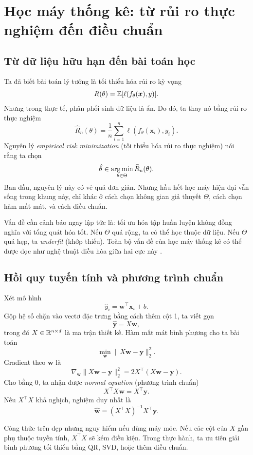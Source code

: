 \chapter{Học máy thống kê: từ rủi ro thực nghiệm đến điều chuẩn}

\section{Từ dữ liệu hữu hạn đến bài toán học}

Ta đã biết bài toán lý tưởng là tối thiểu hóa rủi ro kỳ vọng
\[
R(\theta)=\mathbb{E}[\ell(f_\theta(\bm{x}),y)].
\]
Nhưng trong thực tế, phân phối sinh dữ liệu là ẩn. Do đó, ta thay nó bằng rủi ro thực nghiệm
\[
\widehat{R}_n(\theta)=\frac{1}{n}\sum_{i=1}^n \ell(f_\theta(\bm{x}_i),y_i).
\]
Nguyên lý \emph{empirical risk minimization} (tối thiểu hóa rủi ro thực nghiệm) nói rằng ta chọn
\[
\hat{\theta}\in\mathop{\mathrm{arg\,min}}_{\theta\in\Theta}\widehat{R}_n(\theta).
\]
Ban đầu, nguyên lý này có vẻ quá đơn giản. Nhưng hầu hết học máy hiện đại vẫn sống trong khung này, chỉ khác ở cách chọn không gian giả thuyết \(\Theta\), cách chọn hàm mất mát, và cách điều chuẩn.

Vấn đề cần cảnh báo ngay lập tức là: tối ưu hóa tập huấn luyện không đồng nghĩa với tổng quát hóa tốt. Nếu \(\Theta\) quá rộng, ta có thể học thuộc dữ liệu. Nếu \(\Theta\) quá hẹp, ta \emph{underfit} (khớp thiếu). Toàn bộ vấn đề của học máy thống kê có thể được đọc như nghệ thuật điều hòa giữa hai cực này \citep{bishop2006prml,hastie2009esl}.

\section{Hồi quy tuyến tính và phương trình chuẩn}

Xét mô hình
\[
\hat{y}_i = \bm{w}^\top \bm{x}_i + b.
\]
Gộp hệ số chặn vào vectơ đặc trưng bằng cách thêm cột 1, ta viết gọn
\[
\hat{\bm{y}} = X\bm{w},
\]
trong đó $X\in\mathbb{R}^{n\times d}$ là ma trận thiết kế. Hàm mất mát bình phương cho ta bài toán
\[
\min_{\bm{w}} \|X\bm{w}-\bm{y}\|_2^2.
\]
Gradient theo \(\bm{w}\) là
\[
\nabla_{\bm{w}}\|X\bm{w}-\bm{y}\|_2^2 = 2X^\top(X\bm{w}-\bm{y}).
\]
Cho bằng 0, ta nhận được \emph{normal equation} (phương trình chuẩn)
\[
X^\top X\bm{w}=X^\top \bm{y}.
\]
Nếu $X^\top X$ khả nghịch, nghiệm duy nhất là
\[
\hat{\bm{w}}=(X^\top X)^{-1}X^\top \bm{y}.
\]

\begin{remark}
Công thức trên đẹp nhưng nguy hiểm nếu dùng máy móc. Nếu các cột của $X$ gần phụ thuộc tuyến tính, $X^\top X$ sẽ kém điều kiện. Trong thực hành, ta ưu tiên giải bình phương tối thiểu bằng QR, SVD, hoặc thêm điều chuẩn.
\end{remark}

